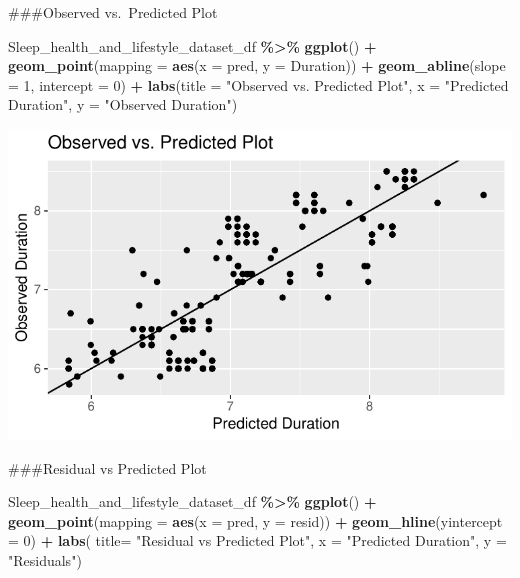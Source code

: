 \documentclass[
  11pt,
]{article}
\newenvironment{Shaded}{\begin{snugshade}}{\end{snugshade}}
\newcommand{\AttributeTok}[1]{\textcolor[rgb]{0.13,0.29,0.53}{#1}}
\newcommand{\DecValTok}[1]{\textcolor[rgb]{0.00,0.00,0.81}{#1}}
\newcommand{\FunctionTok}[1]{\textcolor[rgb]{0.13,0.29,0.53}{\textbf{#1}}}
\newcommand{\NormalTok}[1]{#1}
\newcommand{\SpecialCharTok}[1]{\textcolor[rgb]{0.81,0.36,0.00}{\textbf{#1}}}
\newcommand{\StringTok}[1]{\textcolor[rgb]{0.31,0.60,0.02}{#1}}
\begin{document}
\#\#\#Observed vs.~Predicted Plot

\begin{Shaded}
\begin{Highlighting}[]
\NormalTok{Sleep\_health\_and\_lifestyle\_dataset\_df }\SpecialCharTok{\%\textgreater{}\%}
  \FunctionTok{ggplot}\NormalTok{() }\SpecialCharTok{+}
  \FunctionTok{geom\_point}\NormalTok{(}\AttributeTok{mapping =} \FunctionTok{aes}\NormalTok{(}\AttributeTok{x =}\NormalTok{ pred, }\AttributeTok{y =}\NormalTok{ Duration)) }\SpecialCharTok{+}
  \FunctionTok{geom\_abline}\NormalTok{(}\AttributeTok{slope =} \DecValTok{1}\NormalTok{, }\AttributeTok{intercept =} \DecValTok{0}\NormalTok{) }\SpecialCharTok{+}
  \FunctionTok{labs}\NormalTok{(}\AttributeTok{title =} \StringTok{"Observed vs. Predicted Plot"}\NormalTok{, }\AttributeTok{x =} \StringTok{"Predicted Duration"}\NormalTok{, }\AttributeTok{y =} \StringTok{"Observed Duration"}\NormalTok{)}
\end{Highlighting}
\end{Shaded}

\begin{center}\includegraphics[width=0.7\linewidth]{SleepHelath_files/figure-latex/unnamed-chunk-58-1} \end{center}

\#\#\#Residual vs Predicted Plot

\begin{Shaded}
\begin{Highlighting}[]
\NormalTok{Sleep\_health\_and\_lifestyle\_dataset\_df }\SpecialCharTok{\%\textgreater{}\%}
  \FunctionTok{ggplot}\NormalTok{() }\SpecialCharTok{+}
  \FunctionTok{geom\_point}\NormalTok{(}\AttributeTok{mapping =} \FunctionTok{aes}\NormalTok{(}\AttributeTok{x =}\NormalTok{ pred, }\AttributeTok{y =}\NormalTok{ resid)) }\SpecialCharTok{+}
  \FunctionTok{geom\_hline}\NormalTok{(}\AttributeTok{yintercept =} \DecValTok{0}\NormalTok{) }\SpecialCharTok{+}
  \FunctionTok{labs}\NormalTok{( }\AttributeTok{title=} \StringTok{"Residual vs Predicted Plot"}\NormalTok{,}
        \AttributeTok{x =} \StringTok{"Predicted Duration"}\NormalTok{,}
        \AttributeTok{y =} \StringTok{"Residuals"}\NormalTok{)}
\end{Highlighting}
\end{Shaded}
\end{document}
